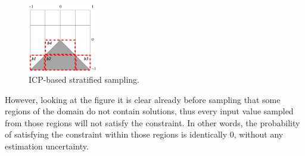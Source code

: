 \begin{figure}[h!]\label{fig:stratifiedICP}
  \centering
      \includegraphics[width=3cm]{triangle}
  \caption{ICP-based stratified sampling.}
\end{figure}

However, looking at the figure it is clear already before sampling that some regions of the domain do not contain solutions, thus every input value sampled from those regions will not satisfy the constraint. In other words, the probability of satisfying the constraint within those regions is identically 0, without any estimation uncertainty. 
